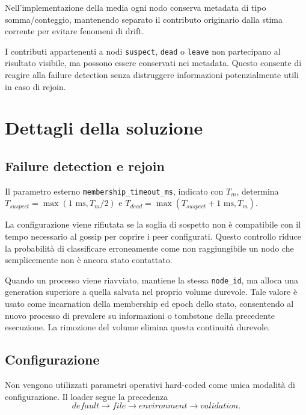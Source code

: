 \documentclass[conference]{IEEEtran}
\begin{document}
Nell'implementazione della media ogni nodo conserva metadata di tipo somma/conteggio, mantenendo separato il contributo originario dalla stima corrente per evitare fenomeni di drift.

I contributi appartenenti a nodi \texttt{suspect}, \texttt{dead} o \texttt{leave} non partecipano al risultato visibile, ma possono essere conservati nei metadata. Questo consente di reagire alla failure detection senza distruggere informazioni potenzialmente utili in caso di rejoin.

\section{Dettagli della soluzione}

\subsection{Failure detection e rejoin}

Il parametro esterno \texttt{membership\_timeout\_ms}, indicato con $T_m$, determina $T_{suspect}=\max(1\text{ ms},T_m/2)$ e $T_{dead}=\max(T_{suspect}+1\text{ ms},T_m)$.

La configurazione viene rifiutata se la soglia di sospetto non è compatibile con il tempo necessario al gossip per coprire i peer configurati. Questo controllo riduce la probabilità di classificare erroneamente come non raggiungibile un nodo che semplicemente non è ancora stato contattato.

Quando un processo viene riavviato, mantiene la stessa \texttt{node\_id}, ma alloca una generation superiore a quella salvata nel proprio volume durevole. Tale valore è usato come incarnation della membership ed epoch dello stato, consentendo al nuovo processo di prevalere su informazioni o tombstone della precedente esecuzione. La rimozione del volume elimina questa continuità durevole.

\subsection{Configurazione}

Non vengono utilizzati parametri operativi hard-coded come unica modalità di configurazione. Il loader segue la precedenza
\begin{equation}
default \rightarrow file \rightarrow environment \rightarrow validation.
\end{equation}
\end{document}
